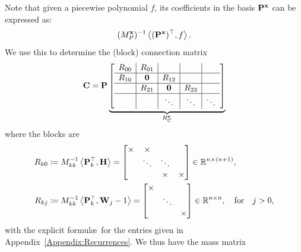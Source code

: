 \documentclass[hidelinks,onefignum,onetabnum]{siamart220329}
\def\bfP{{\bf P}}
\def\bfC{{\bf C}}
\def\bfW{{\bf W}}
\def\bfx{{\bf x}}
\def\bfH{{\bf H}}
\def\bfzero{{\bf 0}}
\def\ip<#1>{\left\langle{#1}\right\rangle}
\def\appref#1{Appendix~\ref{Appendix:#1}}
\def\qfor{\quad\hbox{for}\quad}
\def\bbR{{\mathbb R}}
\begin{document}
Note that given a piecewise polynomial $f$, its coefficients in the basis $\bfP^\bfx$ can be expressed as:
\[
	(M_P^\bfx)^{-1} \ip<(\bfP^\bfx)^\top, f>.
\]
We use this to determine  the (block) connection matrix
\[
	\bfC = \bfP \underbrace{\left[\begin{array}{c | c|c |c | c}
		R_{00} &R_{01}  &&\\
		\hline
		R_{10} & \bfzero  &R_{12}  &\\
		\hline
		&R_{21}  & \bfzero &R_{23} \\
		\hline 
		&& \ddots & \ddots & \ddots
	\end{array}\right]}_{R_C^\bfx}
\]
where the blocks are
\begin{align}
R_{k0} &\coloneqq M_{kk}^{-1} \ip< \bfP_k^\top, \bfH> 
= \begin{bmatrix}
\times & \times \\ & \ddots & \ddots \\&& \times & \times
\end{bmatrix}\in \bbR^{n \times (n+1)}, \label{rec:conversion1} \\
R_{kj} &\coloneqq M_{kk}^{-1} \ip< \bfP_k^\top, \bfW_{j-1}> 
= \begin{bmatrix}
\times & \\ & \ddots  \\&& \times 
\end{bmatrix} \in \bbR^{n \times n},\qfor j > 0,\label{rec:conversion2}
\end{align}
with the explicit formul\ae\ for the entries given in \appref{Recurrences}.
We thus have the mass matrix
\end{document}
